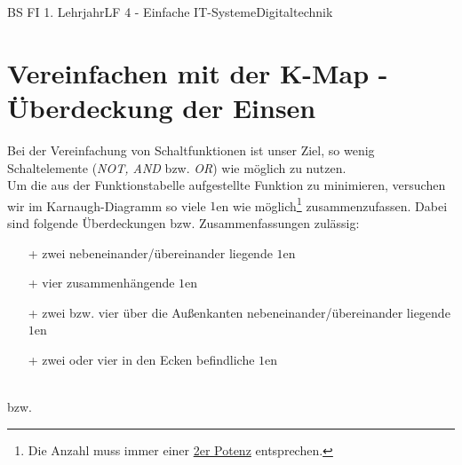 \documentclass[11pt,twocolumn,oneside,openany,headings=optiontotoc,11pt,numbers=noenddot]{article}
\begin{document}
\begin{worksheet}{BS FI 1. Lehrjahr}{LF 4 - Einfache IT-Systeme}{Digitaltechnik}
		\section*{Vereinfachen mit der K-Map - Überdeckung der Einsen}
		Bei der Vereinfachung von Schaltfunktionen ist unser Ziel, so wenig Schaltelemente (\textit{NOT, AND} bzw. \textit{OR}) wie möglich zu nutzen.\\
		Um die aus der Funktionstabelle aufgestellte Funktion zu minimieren, versuchen wir im Karnaugh-Diagramm so viele \(1\)en wie möglich\footnote{Die Anzahl muss immer einer \underline{2er Potenz} entsprechen.} zusammenzufassen. Dabei sind folgende Überdeckungen bzw. Zusammenfassungen zulässig:
		\begin{itemize}
			\item[+] zwei nebeneinander/übereinander liegende \(1\)en\\
			\begin{karnaugh-map}[4][4][1][$x_1x_0$][$x_3x_2$]
			\end{karnaugh-map}
			\item[+] vier zusammenhängende \(1\)en\\
			\begin{karnaugh-map}[4][4][1][$x_1x_0$][$x_3x_2$]
			\end{karnaugh-map}
			\item[+] zwei bzw. vier über die Außenkanten nebeneinander/übereinander liegende \(1\)en
			\begin{karnaugh-map}[4][4][1][$x_1x_0$][$x_3x_2$]
			\end{karnaugh-map}
			\item[+] zwei oder vier in den Ecken befindliche \(1\)en
		\end{itemize}
		\begin{karnaugh-map}[4][4][1][$x_1x_0$][$x_3x_2$]
		\end{karnaugh-map}\\
		bzw.\\
		\begin{karnaugh-map}[4][4][1][$x_1x_0$][$x_3x_2$]
			\implicantcorner
		\end{karnaugh-map}
	\end{worksheet}
\end{document}
